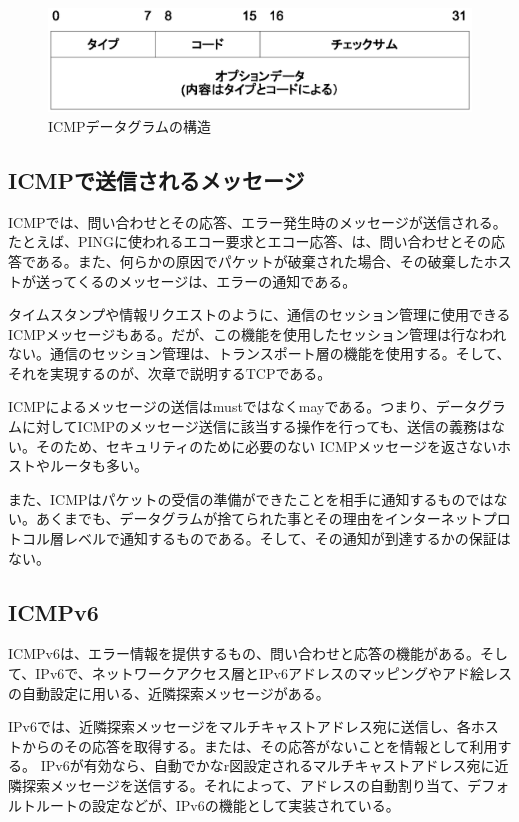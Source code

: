 \begin{figure}[htbp]
	\includegraphics[width=12cm,clip]{draw/icmpheader.eps}
	\caption{ICMPデータグラムの構造}
	\label{fig:icmpheader}
\end{figure}


\subsection{ICMPで送信されるメッセージ}

ICMPでは、問い合わせとその応答、エラー発生時のメッセージが送信される。たとえば、PINGに使われるエコー要求とエコー応答、は、問い合わせとその応答である。また、何らかの原因でパケットが破棄された場合、その破棄したホストが送ってくるのメッセージは、エラーの通知である。

タイムスタンプや情報リクエストのように、通信のセッション管理に使用できるICMPメッセージもある。だが、この機能を使用したセッション管理は行なわれない。通信のセッション管理は、トランスポート層の機能を使用する。そして、それを実現するのが、次章で説明するTCPである。

ICMPによるメッセージの送信はmustではなくmayである。つまり、データグラムに対してICMPのメッセージ送信に該当する操作を行っても、送信の義務はない。そのため、セキュリティのために必要のない ICMPメッセージを返さないホストやルータも多い。

また、ICMPはパケットの受信の準備ができたことを相手に通知するものではない。あくまでも、データグラムが捨てられた事とその理由をインターネットプロトコル層レベルで通知するものである。そして、その通知が到達するかの保証はない。

\subsection{ICMPv6}
ICMPv6は、エラー情報を提供するもの、問い合わせと応答の機能がある。そして、IPv6で、ネットワークアクセス層とIPv6アドレスのマッピングやアド絵レスの自動設定に用いる、近隣探索メッセージがある。

IPv6では、近隣探索メッセージをマルチキャストアドレス宛に送信し、各ホストからのその応答を取得する。または、その応答がないことを情報として利用する。
IPv6が有効なら、自動でかなr図設定されるマルチキャストアドレス宛に近隣探索メッセージを送信する。それによって、アドレスの自動割り当て、デフォルトルートの設定などが、IPv6の機能として実装されている。

